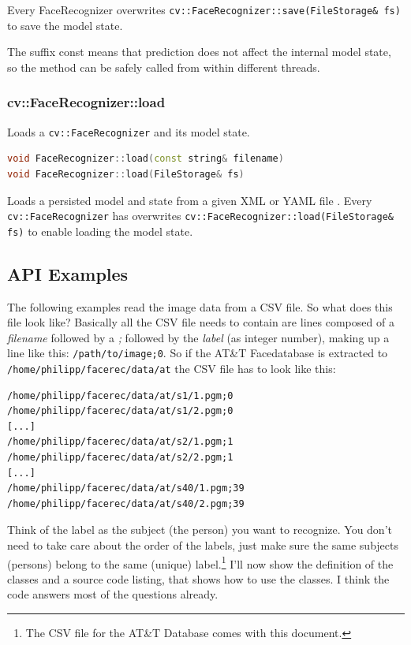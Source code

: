 Every FaceRecognizer overwrites \lstinline|cv::FaceRecognizer::save(FileStorage& fs)| to save the model state.

The suffix const means that prediction does not affect the internal model state, so the method can be safely called from within different threads.

\subsubsection{cv::FaceRecognizer::load}

Loads a \lstinline|cv::FaceRecognizer| and its model state.

\begin{lstlisting}[language=c++]
void FaceRecognizer::load(const string& filename)
void FaceRecognizer::load(FileStorage& fs)
\end{lstlisting}

Loads a persisted model and state from a given XML or YAML file . Every \lstinline|cv::FaceRecognizer| has overwrites \lstinline|cv::FaceRecognizer::load(FileStorage& fs)| to enable loading the model state. 

\subsection{API Examples}

The following examples read the image data from a CSV file. So what does this file look like? Basically all the CSV file needs to contain are lines composed of a \textit{filename} followed by a \textit{;} followed by the \textit{label} (as integer number), making up a line like this: \lstinline|/path/to/image;0|. So if the AT\&T Facedatabase is extracted to \lstinline|/home/philipp/facerec/data/at| the CSV file has to look like this:

\begin{lstlisting}
/home/philipp/facerec/data/at/s1/1.pgm;0
/home/philipp/facerec/data/at/s1/2.pgm;0
[...]
/home/philipp/facerec/data/at/s2/1.pgm;1
/home/philipp/facerec/data/at/s2/2.pgm;1
[...]
/home/philipp/facerec/data/at/s40/1.pgm;39
/home/philipp/facerec/data/at/s40/2.pgm;39
\end{lstlisting}

Think of the label as the subject (the person) you want to recognize. You don't need to take care about the order of the labels, just make sure the same subjects (persons) belong to the same (unique) label.\footnote{The CSV file for the AT\&T Database comes with this document.} I'll now show the definition of the classes and a source code listing, that shows how to use the classes. I think the code answers most of the questions already.

